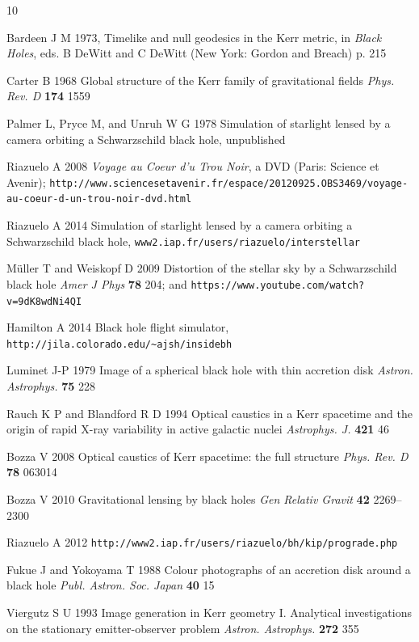 \documentclass[12pt]{iopart}
\begin{document}
\begin{thebibliography}{10}

 Bardeen J M 1973,  Timelike and null geodesics in the Kerr metric, in {\it Black Holes}, eds. B DeWitt and C DeWitt (New York: Gordon and Breach) p. 215

 Carter B 1968  Global structure of the Kerr family of gravitational fields  {\it Phys. Rev. D} {\bf 174} 1559

 Palmer L, Pryce M, and Unruh W G 1978  Simulation of starlight lensed by a camera orbiting a  Schwarzschild black hole, unpublished

 Riazuelo A 2008 {\it Voyage au Coeur d'u Trou Noir}, a DVD (Paris: Science et Avenir); \verb"http://www.sciencesetavenir.fr/espace/20120925.OBS3469/voyage-au-coeur-d-un-trou-noir-dvd.html"

 Riazuelo A 2014 Simulation of starlight lensed by a camera orbiting a Schwarzschild black hole, \verb"www2.iap.fr/users/riazuelo/interstellar"

 M\"uller T and Weiskopf D 2009 Distortion of the stellar sky by a Schwarzschild black hole {\it Amer J Phys} {\bf 78} 204; and \verb"https://www.youtube.com/watch?v=9dK8wdNi4QI" 

 Hamilton A 2014 Black hole flight simulator,  \verb"http://jila.colorado.edu/~ajsh/insidebh"

 Luminet J-P 1979 Image of a spherical black hole with thin accretion disk {\it Astron. Astrophys.} {\bf 75} 228

 Rauch K P and Blandford R D 1994 Optical caustics in a Kerr spacetime and the origin of rapid X-ray variability in active galactic nuclei {\it Astrophys. J.} {\bf 421} 46

 Bozza V 2008 Optical caustics of Kerr spacetime: the full structure {\it Phys. Rev. D} {\bf 78} 063014

 Bozza V 2010 Gravitational lensing by black holes {\it Gen Relativ Gravit} {\bf 42} 2269--2300

 Riazuelo A 2012 \verb"http://www2.iap.fr/users/riazuelo/bh/kip/prograde.php"

 Fukue J and Yokoyama T 1988 Colour photographs of an accretion disk around a black hole {\it Publ. Astron. Soc. Japan} {\bf 40} 15

 Viergutz S U 1993  Image generation in Kerr geometry I. Analytical investigations on the stationary emitter-observer problem {\it Astron. Astrophys.} {\bf 272} 355


\end{thebibliography}
\end{document}
